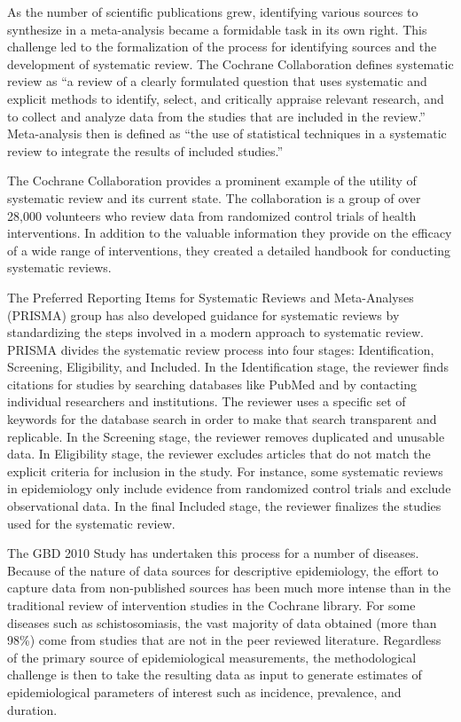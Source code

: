 As the number of scientific publications grew, identifying various
sources to synthesize in a meta-analysis became a formidable task in
its own right. This challenge led to the formalization of the process
for identifying sources and the development of systematic review. The
Cochrane Collaboration defines systematic review as ``a review of a
clearly formulated question that uses systematic and explicit methods
to identify, select, and critically appraise relevant research, and to
collect and analyze data from the studies that are included in the
review.'' Meta-analysis then is defined as ``the use of statistical
techniques in a systematic review to integrate the results of included
studies.''\cite{Green_Systematic_2005}

The Cochrane Collaboration provides a prominent example of the utility
of systematic review and its current state. The collaboration is a
group of over 28,000 volunteers who review data from randomized
control trials of health interventions.\cite{_cochrane_2012} In addition to the valuable information
they provide on the efficacy of a wide range of interventions, they
created a detailed handbook for conducting systematic
reviews.

The Preferred Reporting Items for Systematic Reviews and Meta-Analyses
(PRISMA) group has also developed guidance for systematic reviews by
standardizing the steps involved in a modern approach to systematic
review.\cite{Liberati_PRISMA_2009} PRISMA divides the systematic
review process into four stages: Identification, Screening,
Eligibility, and Included.  In the Identification stage, the reviewer
finds citations for studies by searching databases like PubMed and by
contacting individual researchers and institutions. The reviewer uses
a specific set of keywords for the database search in order to make
that search transparent and replicable. In the Screening stage, the
reviewer removes duplicated and unusable data. In Eligibility stage,
the reviewer excludes articles that do not match the explicit criteria
for inclusion in the study. For instance, some systematic reviews in
epidemiology only include evidence from randomized control trials and
exclude observational data. In the final Included stage, the reviewer
finalizes the studies used for the systematic review.

The GBD 2010 Study has undertaken this process for a number of
diseases. Because of the nature of data sources for descriptive
epidemiology, the effort to capture data from non-published sources
has been much more intense than in the traditional review of
intervention studies in the Cochrane library.  For some diseases such
as schistosomiasis, the vast majority of data obtained (more than
98\%) come from studies that are not in the peer reviewed literature.
Regardless of the primary source of epidemiological measurements, the
methodological challenge is then to take the resulting data as input
to generate estimates of epidemiological parameters of interest such
as incidence, prevalence, and duration.

